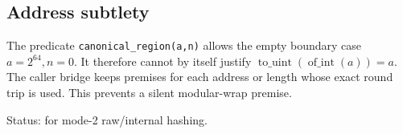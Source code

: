 \subsection{Address subtlety}

The predicate \texttt{canonical\_region(a,n)} allows the empty boundary case
\(a=2^{64},n=0\). It therefore cannot by itself justify
\(\operatorname{to\_uint}(\operatorname{of\_int}(a))=a\). The caller bridge
keeps  premises for each address or length
whose exact round trip is used. This prevents a silent modular-wrap premise.

Status:  for mode-2 raw/internal hashing.
